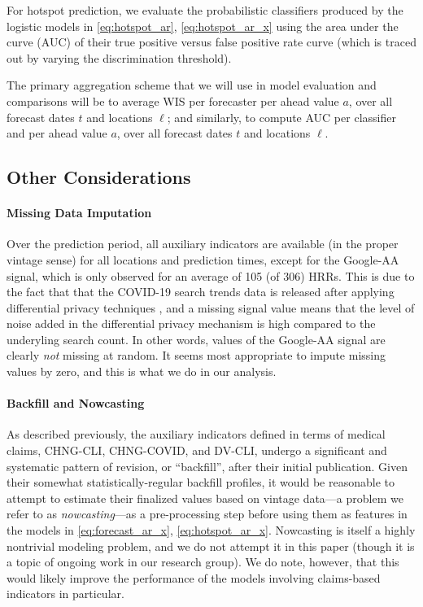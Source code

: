 \documentclass[9pt,twocolumn,twoside,lineno]{pnas-new}
\begin{document}
For hotspot prediction, we evaluate the probabilistic classifiers produced by
the logistic models in \eqref{eq:hotspot_ar}, \eqref{eq:hotspot_ar_x} using the 
area under the curve (AUC) of their true positive versus false positive rate
curve (which is traced out by varying the discrimination threshold). 

The primary aggregation scheme that we will use in model evaluation and
comparisons will be to average WIS per forecaster per ahead value $a$, over all
forecast dates $t$ and locations $\ell$; and similarly, to compute AUC per
classifier and per ahead value $a$, over all forecast dates $t$ and locations
$\ell$.

\subsection{Other Considerations}

\paragraph{Missing Data Imputation}

Over the prediction period, all auxiliary indicators are available (in the
proper vintage sense) for all locations and prediction times, except for the
Google-AA signal, which is only observed for an average of 105 (of 306) HRRs.
This is due to the fact that that the COVID-19 search trends data is released
after applying differential privacy techniques \cite{Bavadekar:2020}, and a
missing signal value means that the level of noise added in the differential
privacy mechanism is high compared to the underyling search count.  In other
words, values of the Google-AA signal are clearly \textit{not} missing at
random.  It seems most appropriate to impute missing values by zero, and this 
is what we do in our analysis.

\paragraph{Backfill and Nowcasting}  

As described previously, the auxiliary indicators defined in terms of medical
claims, CHNG-CLI, CHNG-COVID, and DV-CLI, undergo a significant and systematic
pattern of revision, or ``backfill'', after their initial publication.  Given
their somewhat statistically-regular backfill profiles, it would be reasonable
to attempt to estimate their finalized values based on vintage data---a problem
we refer to as \textit{nowcasting}---as a pre-processing step before using them
as features in the models in \eqref{eq:forecast_ar_x}, \eqref{eq:hotspot_ar_x}. 
Nowcasting is itself a highly nontrivial modeling problem, and we do not attempt
it in this paper (though it is a topic of ongoing work in our research group).
We do note, however, that this would likely improve the performance of the
models involving claims-based indicators in particular.   
\end{document}
